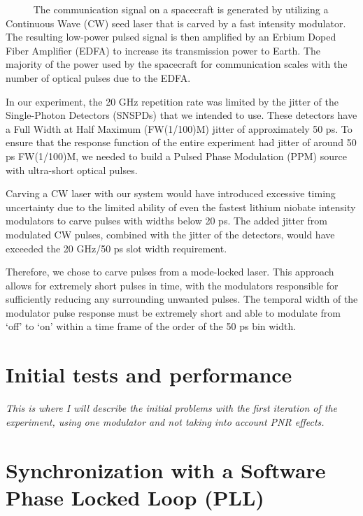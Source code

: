 \documentclass[12pt]{caltech_thesis}
\begin{document}
~~~~~ The communication signal on a spacecraft is generated by utilizing
a Continuous Wave (CW) seed laser that is carved by a fast intensity
modulator. The resulting low-power pulsed signal is then amplified by an
Erbium Doped Fiber Amplifier (EDFA) to increase its transmission power
to Earth. The majority of the power used by the spacecraft for
communication scales with the number of optical pulses due to the EDFA.

In our experiment, the 20 GHz repetition rate was limited by the jitter
of the Single-Photon Detectors (SNSPDs) that we intended to use. These
detectors have a Full Width at Half Maximum (FW(1/100)M) jitter of
approximately 50 ps. To ensure that the response function of the entire
experiment had jitter of around 50 ps FW(1/100)M, we needed to build a
Pulsed Phase Modulation (PPM) source with ultra-short optical pulses.

Carving a CW laser with our system would have introduced excessive
timing uncertainty due to the limited ability of even the fastest
lithium niobate intensity modulators to carve pulses with widths below
20 ps. The added jitter from modulated CW pulses, combined with the
jitter of the detectors, would have exceeded the 20 GHz/50 ps slot width
requirement.

Therefore, we chose to carve pulses from a mode-locked laser. This
approach allows for extremely short pulses in time, with the modulators
responsible for sufficiently reducing any surrounding unwanted pulses.
The temporal width of the modulator pulse response must be extremely
short and able to modulate from `off' to `on' within a time frame of the
order of the 50 ps bin width.

\hypertarget{initial-tests-and-performance}{%
\section{Initial tests and
performance}\label{initial-tests-and-performance}}

\emph{This is where I will describe the initial problems with the first
iteration of the experiment, using one modulator and not taking into
account PNR effects.}

\hypertarget{synchronization-with-a-software-phase-locked-loop-pll}{%
\section{Synchronization with a Software Phase Locked Loop
(PLL)}\label{synchronization-with-a-software-phase-locked-loop-pll}}
\end{document}
